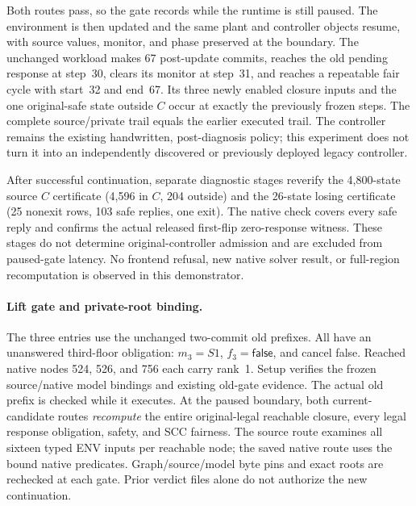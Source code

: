 Both routes pass, so the gate records  while the runtime is
still paused. The environment is then updated and the same plant and
controller objects resume, with source values, monitor, and phase
preserved at the boundary. The unchanged workload makes 67 post-update
commits, reaches the old pending response at step~30, clears its monitor
at step~31, and reaches a repeatable fair cycle with start~32 and
end~67. Its three newly enabled closure inputs and the one original-safe
state outside $C$ occur at exactly the previously frozen steps.
The complete source/private trail equals the earlier executed trail.
The controller remains the existing handwritten, post-diagnosis policy;
this experiment does not turn it into an independently discovered or
previously deployed legacy controller.

After successful continuation, separate diagnostic stages reverify the
4,800-state source $C$ certificate (4,596 in $C$, 204 outside) and the
26-state losing certificate (25 nonexit rows, 103 safe replies, one exit).
The native check covers every safe reply and confirms the actual
released first-flip zero-response witness. These stages do not determine
original-controller admission and are excluded from paused-gate latency.
No frontend refusal, new native solver result, or full-region
recomputation is observed in this demonstrator.

\paragraph{Lift gate and private-root binding.}
The three entries use the unchanged two-commit old prefixes. All have
an unanswered third-floor obligation: $m_3=S1$, $f_3=\mathsf{false}$,
and cancel false. Reached native nodes 524, 526, and 756 each carry
rank~1. Setup verifies the frozen source/native model bindings and
existing old-gate evidence. The actual old prefix is checked while it
executes. At the paused boundary, both current-candidate routes
\emph{recompute} the entire original-legal reachable closure, every
legal response obligation, safety, and SCC fairness. The source route
examines all sixteen typed ENV inputs per reachable node; the saved
native route uses the bound native predicates. Graph/source/model byte
pins and exact roots are rechecked at each gate. Prior verdict files
alone do not authorize the new continuation.

